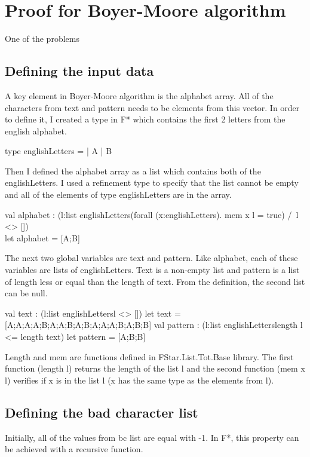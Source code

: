 \chapter{Proof for Boyer-Moore algorithm}

One of the problems

\section{Defining the input data}

A key element in Boyer-Moore algorithm is the alphabet array. All of the characters from text and pattern needs to be elements from this vector. In order to define it, I created a type in F* which contains the first 2 letters from the english alphabet.

{ \selectfont
type englishLetters = 
  | A
  | B
}

Then I defined the alphabet array as a list which contains both of the englishLetters. I used a refinement type to specify that the list cannot be empty and all of the elements of type englishLetters are in the array.

{ \selectfont
val alphabet : (l:list englishLetters{(forall (x:englishLetters). mem x l = true) /\  l <> []}) \\
let alphabet = [A;B]
}

The next two global variables are text and pattern. Like alphabet, each of these variables are lists of englishLetters. Text is a non-empty list and pattern is a list of length less or equal than the length of text. From the definition, the second list can be null.

{ \selectfont
val text : (l:list englishLetters{l <> []})
let text = [A;A;A;A;B;A;A;B;A;B;A;A;A;B;A;B;B]
val pattern : (l:list englishLetters{length l <= length text})
let pattern = [A;B;B]
}

Length and mem are functions defined in FStar.List.Tot.Base library. The first function (length l) returns the length of the list l and the second function (mem x l) verifies if x is in the list l (x has the same type as the elements from l).

\section{Defining the bad character list}

Initially, all of the values from bc list are equal with -1. In F*, this property can be achieved with a recursive function.

